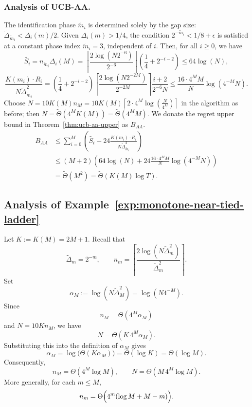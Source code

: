 \documentclass[
  12pt]{article}
\begin{document}
\subsubsection*{Analysis of UCB-AA.}
The identification phase $\tilde{m}_i$ is determined solely by the gap size: $\tilde{\Delta}_{\tilde{m}_i} < \Delta_i(m)/2$. Given $\Delta_i(m) > 1/4$, the condition $2^{-\tilde{m}_i} < 1/8 + \epsilon$ is satisfied at a constant phase index $\tilde{m}_i = 3$, independent of $i$. Then, for all $i\geq0$, we have
\[
\tilde{S_i}=n_{\tilde{m}_i}\Delta_i(M)=\left\lceil \frac{2 \log(N 2^{-6})}{2^{-6}} \right\rceil \left( \frac{1}{4} + 2^{-i-2} \right) \leq 64\log(N),
\]
\[
\frac{K(m_i)\cdot R_i}{N\tilde{\Delta}_{\tilde{m}_i}^2} = \left( \frac{1}{4} + 2^{-i-2} \right) \left\lceil \frac{2 \log(N 2^{-2M})}{2^{-2M}} \right\rceil\frac{i+2}{2^{-6}N}\leq \frac{16 \cdot4^MM}{N}\log(4^{-M}N).
\]
Choose $N=10K(M)n_{M}=10 K(M) \left\lceil 2\cdot 4^M\log\left(\frac{N}{4^M}\right) \right\rceil$ in the algorithm as before; then $N=\tilde{\Theta}(4^MK(M))=\tilde{\Theta}(4^MM)$. We donate the regret upper bound in Theorem~\ref{thm:ucb-aa-upper} as $B_{AA}$.
\[
\begin{aligned}
B_{AA} &\le  \sum_{i=0}^{M}  \left(\tilde{S_i}+ 24\frac{K(m_i)\cdot R_i}{N\tilde{\Delta}_{\tilde{m}_i}^2}\right)\\
&\leq (M+2)\left(64\log(N) + 24\frac{16 \cdot4^MM}{N}\log(4^{-M}N)\right)\\
&= \tilde{\Theta}(M^2)=\tilde{\Theta}(K(M)\log T).
\end{aligned}
\]





\subsection{Analysis of Example~\ref{exp:monotone-near-tied-ladder}}
\label{sec:Analysis of exp:monotone-near-tied-ladder}

Let $K:=K(M)=2M+1$. Recall that
\[
\tilde\Delta_m = 2^{-m},
\qquad
n_m
=
\left\lceil
\frac{2\log(N\tilde\Delta_m^2)}{\tilde\Delta_m^2}
\right\rceil.
\]
Set
\[
\alpha_M := \log(N\tilde\Delta_M^2)=\log(N4^{-M}).
\]
Since
\[
n_M = \Theta(4^M\alpha_M)
\]
and $N=10Kn_M$, we have
\[
N=\Theta(K\,4^M\alpha_M).
\]
Substituting this into the definition of $\alpha_M$ gives
\[
\alpha_M = \log\bigl(\Theta(K\alpha_M)\bigr)=\Theta(\log K)=\Theta(\log M).
\]
Consequently,
\[
n_M=\Theta(4^M\log M),
\qquad
N=\Theta(M\,4^M\log M).
\]
More generally, for each $m\le M$,
\begin{equation}
\label{eq:nm-growth}
n_m
=
\Theta\Bigl(4^m(\log M+M-m)\Bigr).
\end{equation}
\end{document}
